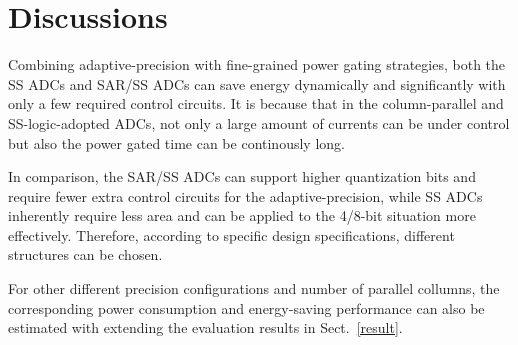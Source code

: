 \section{Discussions}\label{discussion}
Combining adaptive-precision with fine-grained power gating strategies, both the SS ADCs and SAR/SS ADCs can save energy dynamically and significantly with only a few required control circuits. 
It is because that in the column-parallel and SS-logic-adopted ADCs, not only a large amount of currents can be under control but also the power gated time can be continously long. 

In comparison, the SAR/SS ADCs can support higher quantization bits and require fewer extra control circuits for the adaptive-precision, 
while SS ADCs inherently require less area and can be applied to the 4/8-bit situation more effectively. 
Therefore, according to specific design specifications, different structures can be chosen. 

For other different precision configurations and number of parallel collumns, 
the corresponding power consumption and energy-saving performance can also be estimated with extending the evaluation results in Sect.~\ref{result}.